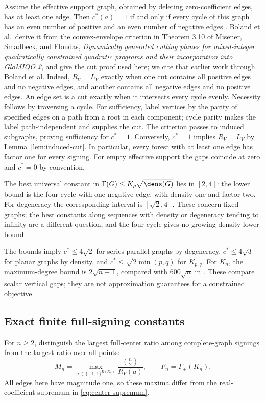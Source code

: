 Assume the effective support graph, obtained by deleting zero-coefficient
edges, has at least one edge. Then $c^*(a)=1$ if and only if every cycle
of this graph
has an even number of positive and an even number of negative edges
\citep[Theorem 4]{Boland2017}. Boland et al.\ derive it from the
convex-envelope criterion in Theorem 3.10 of Misener, Smadbeck, and
Floudas, \emph{Dynamically generated cutting planes for mixed-integer
quadratically constrained quadratic programs and their incorporation into
GloMIQO 2}, and give the cut proof used here; we cite that earlier work
through Boland et al.
Indeed, $R_V=L_V$ exactly when one cut
contains all positive edges and no negative edges, and another contains
all negative edges and no positive edges. An edge set is a cut exactly
when it intersects every cycle evenly. Necessity follows by traversing a
cycle. For sufficiency, label vertices by the parity of specified edges
on a path from a root in each component; cycle parity makes the label
path-independent and supplies the cut. The criterion passes to induced
subgraphs, proving sufficiency for $c^*=1$. Conversely, $c^*=1$ implies
$R_V=L_V$ by Lemma~\ref{lem:induced-cut}. In particular, every forest with
at least one edge has factor one for every signing. For empty effective
support the gaps coincide at zero and $c^*=0$ by convention.

The best universal constant in $\Gamma(G)\le K_\rho\sqrt{\dens(G)}$
lies in $[2,4]$: the lower bound is the four-cycle with one negative edge,
with density one and factor two. For degeneracy the corresponding interval
is $[\sqrt2,4]$. These concern fixed graphs; the best constants along
sequences with
density or degeneracy tending to infinity are a different question, and
the four-cycle gives no growing-density lower bound.

The bounds imply $c^*\le4\sqrt2$ for series-parallel graphs by degeneracy,
$c^*\le4\sqrt3$ for planar graphs by density, and
$c^*\le\sqrt{2\min(p,q)}$ for $K_{p,q}$. For $K_n$, the maximum-degree
bound is $2\sqrt{n-1}$, compared with $600\sqrt n$ in
\citet[Theorem 2]{Boland2017}. These compare scalar vertical gaps; they are
not approximation guarantees for a constrained objective.

\subsection{Exact finite full-signing constants}\label{subsec:finite-signings}
For $n\ge2$, distinguish the largest full-center ratio among complete-graph
signings from the largest ratio over all points:
\[
 M_n=\max_{a\in\{-1,1\}^{E(K_n)}}\frac{\binom n2}{R_V(a)},
 \qquad F_n=\Gamma_\pm(K_n).
\]
All edges here have magnitude one, so these maxima differ from the
real-coefficient supremum in \eqref{eq:center-supremum}.

